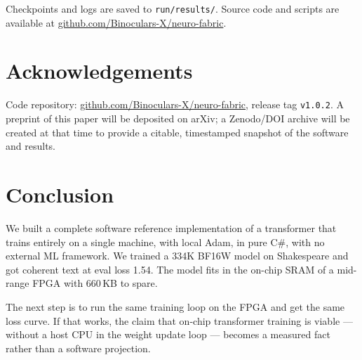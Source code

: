 \documentclass[11pt]{article}
\newcommand{\repourl}{https://github.com/Binoculars-X/neuro-fabric}
\newcommand{\repourltext}{github.com/Binoculars-X/neuro-fabric}
\begin{document}
Checkpoints and logs are saved to \texttt{run/results/}.
Source code and scripts are available at \href{\repourl}{\repourltext}.

\section*{Acknowledgements}

Code repository: \href{\repourl}{\repourltext}, release tag \texttt{v1.0.2}.
A preprint of this paper will be deposited on arXiv; a Zenodo/DOI archive will be
created at that time to provide a citable, timestamped snapshot of the software and results.

\section{Conclusion}

We built a complete software reference implementation of a transformer that trains
entirely on a single machine, with local Adam, in pure C\#, with no external ML
framework. We trained a 334K BF16W model on Shakespeare and got coherent text at
eval loss 1.54. The model fits in the on-chip SRAM of a mid-range FPGA with 660\,KB
to spare.

The next step is to run the same training loop on the FPGA and get the same loss curve.
If that works, the claim that on-chip transformer training is viable --- without a host
CPU in the weight update loop --- becomes a measured fact rather than a software projection.
\end{document}
